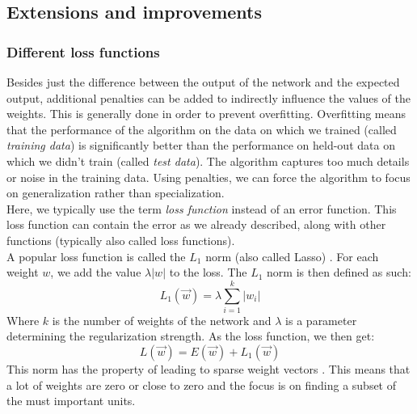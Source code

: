 \subsection{Extensions and improvements} %
\label{ssub:extensions_and_improvements}
\subsubsection{Different loss functions} %
\label{ssub:loss_functions}
Besides just the difference between the output of the network and the expected output, additional penalties can be added to indirectly influence the values of the weights.
This is generally done in order to prevent overfitting.
Overfitting means that the performance of the algorithm on the data on which we trained (called \textit{training data}) is significantly better than the performance on held-out data on which we didn't train (called \textit{test data}).
The algorithm captures too much details or noise in the training data.
Using penalties, we can force the algorithm to focus on generalization rather than specialization.\\
Here, we typically use the term \emph{loss function} instead of an error function.
This loss function can contain the error as we already described, along with other functions (typically also called loss functions).\\

A popular loss function is called the $L_1$ norm (also called Lasso) \parencite{tibshirani1996regression}. For each weight $w$, we add the value $\lambda \vert w \vert$ to the loss. The $L_1$ norm is then defined as such:
\begin{equation}
    L_1(\overrightarrow{w}) = \lambda \sum_{i=1}^k \vert w_i \vert
\end{equation}
Where $k$ is the number of weights of the network and $\lambda$ is a parameter determining the regularization strength.
As the loss function, we then get:
\begin{equation}
    L(\overrightarrow{w}) = E(\overrightarrow{w}) + L_1(\overrightarrow{w})
\end{equation}
This norm has the property of leading to sparse weight vectors \parencite{journals/ftml/BachJMO12}.
This means that a lot of weights are zero or close to zero and the focus is on finding a subset of the must important units.

